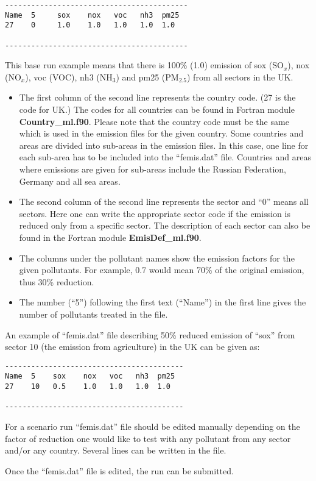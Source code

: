 \begin{verbatim}
------------------------------------------
Name  5     sox    nox   voc   nh3  pm25
27    0     1.0    1.0   1.0   1.0  1.0  

------------------------------------------
\end{verbatim}

\noindent
This base run example means that there is 100\% (1.0) emission of sox (SO$_x$),
nox (NO$_x$), voc (VOC), nh3 (NH$_3$) and pm25 (PM$_{2.5}$) from all
sectors in the UK. 

\begin{itemize}

\item The first column of
the second line represents the country code. (27 is the code for UK.)
The codes for all countries can be found in  Fortran module {\bf
  Country\_ml.f90}. Please note that the country code must be the same
which is used in the emission files for the given country. Some
countries and areas are divided into sub-areas in the emission
files. In this case, one line for each sub-area has to be included
into the ``femis.dat'' file. Countries and areas where emissions are
given for sub-areas include the Russian Federation, Germany and all 
sea areas.    

\item The second
column of the second line 
represents the sector and ``0'' means all sectors. Here one can write
the appropriate sector code if the emission is reduced only from a specific
sector. The description of each sector can also be found in the Fortran
module {\bf EmisDef\_ml.f90}. 

\item The columns under the pollutant names show the emission factors
  for the given pollutants. For example, 0.7 would mean 70\% of the
  original emission, thus 30\% reduction.


\item The number (``5'') following
the first text (``Name'') in the first line gives the number of
pollutants treated in the file.   
              
\end{itemize}

An example of ``femis.dat'' file describing 50\% reduced emission of
``sox'' from sector 10 (the emission from agriculture) in the UK can be given as:  

\begin{verbatim}
-----------------------------------------
Name  5    sox    nox   voc   nh3  pm25 
27    10   0.5    1.0   1.0   1.0  1.0   

-----------------------------------------
\end{verbatim}        

For a scenario run ``femis.dat'' file should be edited 
manually depending on the factor of
reduction one would like to test with any pollutant from any sector
and/or any country. Several lines can be written in the file.

Once the ``femis.dat''  file is
edited, the run can be submitted.  




